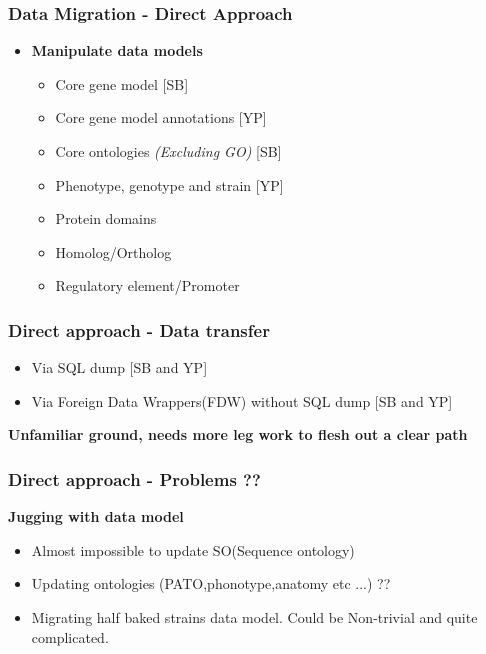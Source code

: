 \documentclass[hyperref={pdfpagelabels=false}, compress]{beamer}
\begin{document}
\begin{frame}
    \frametitle{Data Migration - Direct Approach}
       \begin{itemize}
          \item  \textbf{\Large Manipulate data models}
           \begin{itemize}
               \item Core gene model [SB]
               \item Core gene model annotations [YP]
               \item Core ontologies \textit{(Excluding GO)} [SB]
               \item Phenotype, genotype and strain [YP]
               \item Protein domains
               \item Homolog/Ortholog
               \item Regulatory element/Promoter
           \end{itemize}
          \end{itemize}
\end{frame}


\begin{frame}
    \frametitle{Direct approach - Data transfer}  
          \begin{itemize}
               \item Via SQL dump [SB and YP]
               \item Via Foreign Data Wrappers(FDW) without SQL dump [SB and YP]
           \end{itemize} 
         \textbf{\large Unfamiliar ground, needs more leg work to flesh out a clear path}
\end{frame}

\begin{frame}
    \frametitle{Direct approach - Problems ??}  
         \textbf{\Large Jugging with data model}
          \begin{itemize}
               \item Almost impossible to update SO(Sequence ontology)
               \item Updating ontologies (PATO,phonotype,anatomy etc ...) ??
               \item Migrating half  baked strains data model.  Could be Non-trivial and quite complicated.
           \end{itemize} 
\end{frame}
\end{document}
